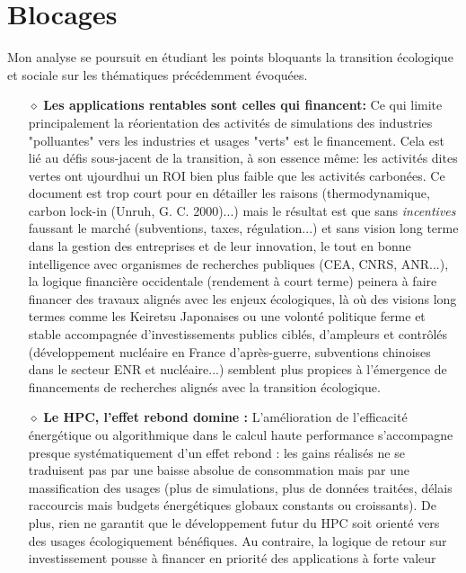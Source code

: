 \documentclass[11pt,a4paper]{article}
\begin{document}
\section{Blocages} 
      Mon analyse se poursuit en étudiant les points bloquants la transition écologique et sociale sur les thématiques précédemment évoquées.
      \begin{itemize}
        \item[$\diamond$]\textbf{Les applications rentables sont celles qui financent: }
          Ce qui limite principalement la réorientation des activités de simulations des industries "polluantes" vers les industries et usages "verts"
          est le financement. Cela est lié au défis sous-jacent de la transition, à son essence même: les activités dites vertes ont ujourdhui un ROI bien plus faible
          que les activités carbonées. Ce document est trop court pour en détailler les raisons (thermodynamique, carbon lock-in (Unruh, G. C. 2000)...) mais le résultat 
          est que sans \textit{incentives} faussant le marché (subventions, taxes, régulation...) et sans vision long terme dans la gestion des entreprises et de leur innovation, le tout en bonne intelligence avec organismes de recherches publiques (CEA, CNRS, ANR...), 
          la logique financière occidentale (rendement à court terme) peinera à faire financer des travaux alignés avec les enjeux écologiques, là où des visions long termes comme les Keiretsu Japonaises
          ou une volonté politique ferme et stable accompagnée d'investissements publics ciblés, d'ampleurs et contrôlés (développement nucléaire en France d'après-guerre, subventions chinoises dans le secteur ENR et nucléaire...) 
          semblent plus propices à l’émergence de financements de recherches alignés avec la transition écologique.
        \item[$\diamond$]\textbf{Le HPC, l'effet rebond domine :}
          L’amélioration de l’efficacité énergétique ou algorithmique dans le calcul haute performance 
          s’accompagne presque systématiquement d’un effet rebond : les gains réalisés ne se traduisent pas par une 
          baisse absolue de consommation mais par une massification des usages (plus de simulations, plus de données traitées, 
          délais raccourcis mais budgets énergétiques globaux constants ou croissants). 
          De plus, rien ne garantit que le développement futur du HPC soit orienté vers des usages écologiquement bénéfiques. 
          Au contraire, la logique de retour sur investissement pousse à financer en priorité des applications à forte valeur 

\end{itemize}
\end{document}
